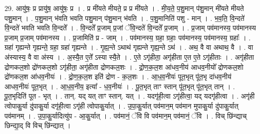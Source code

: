 \documentclass[17pt]{extarticle}
\begin{document}
29. आयु॑षः॒ प्र प्रायु॑ष॒ आयु॑षः॒ प्र । . प्र मी॑यते मीयते॒ प्र प्र मी॑यते । . मी॒य॒ते॒ प॒शु॒मान् प॑शु॒मान् मी॑यते मीयते पशु॒मान् । . प॒शु॒मान् भ॑वति भवति पशु॒मान् प॑शु॒मान् भ॑वति । . प॒शु॒मानिति॑ पशु - मान् । . भ॒व॒ति॒ वि॒न्दते॑ वि॒न्दते॑ भवति भवति वि॒न्दते᳚ । . वि॒न्दते᳚ प्र॒जाम् प्र॒जां ॅवि॒न्दते॑ वि॒न्दते᳚ प्र॒जाम् । . प्र॒जाम् पव॑मानस्य॒ पव॑मानस्य प्र॒जाम् प्र॒जाम् पव॑मानस्य । . प्र॒जामिति॑ प्र - जाम् । . पव॑मानस्य॒ ग्रहा॒ ग्रहाः॒ पव॑मानस्य॒ पव॑मानस्य॒ ग्रहाः᳚ । . ग्रहा॑ गृह्यन्ते गृह्यन्ते॒ ग्रहा॒ ग्रहा॑ गृह्यन्ते । . गृ॒ह्य॒न्ते ऽथाथ॑ गृह्यन्ते गृह्य॒न्ते ऽथ॑ । . अथ॒ वै वा अथाथ॒ वै । . वा अ॑स्यास्य॒ वै वा अ॑स्य । . अ॒स्यै॒त ए॒ते᳚ ऽस्या स्यै॒ते । . ए॒ते ऽगृ॑हीता॒ अगृ॑हीता ए॒त ए॒ते ऽगृ॑हीताः । . अगृ॑हीता द्रोणकल॒शो द्रो॑णकल॒शो ऽगृ॑हीता॒ अगृ॑हीता द्रोणकल॒शः । . द्रो॒ण॒क॒ल॒श आ॑धव॒नीय॑ आधव॒नीयो᳚ द्रोणकल॒शो द्रो॑णकल॒श आ॑धव॒नीयः॑ । . द्रो॒ण॒क॒ल॒श इति॑ द्रोण - क॒ल॒शः । . आ॒ध॒व॒नीयः॑ पूत॒भृत् पू॑त॒भृ दा॑धव॒नीय॑ आधव॒नीयः॑ पूत॒भृत् । . आ॒ध॒व॒नीय॒ इत्या᳚ - ध॒व॒नीयः॑ । . पू॒त॒भृत् ताꣳ स्तान् पू॑त॒भृत् पू॑त॒भृत् तान् । . पू॒त॒भृदिति॑ पूत - भृत् । . तान्. यद् यत् ताꣳ स्तान्. यत् । . यदगृ॑ही॒त्वा ऽगृ॑हीत्वा॒ यद् यदगृ॑हीत्वा । . अगृ॑ही त्वोपाकु॒र्या दु॑पाकु॒र्या दगृ॑ही॒त्वा ऽगृ॑ही त्वोपाकु॒र्यात् । . उ॒पा॒कु॒र्यात् पव॑मान॒म् पव॑मान मुपाकु॒र्या दु॑पाकु॒र्यात् पव॑मानम् । . उ॒पा॒कु॒र्यादित्यु॑प - आ॒कु॒र्यात् । . पव॑मानं॒ ॅवि वि पव॑मान॒म् पव॑मानं॒ ॅवि । . विच् छि॑न्द्याच् छिन्द्या॒द् वि विच् छि॑न्द्यात् । \newline
\end{document}
